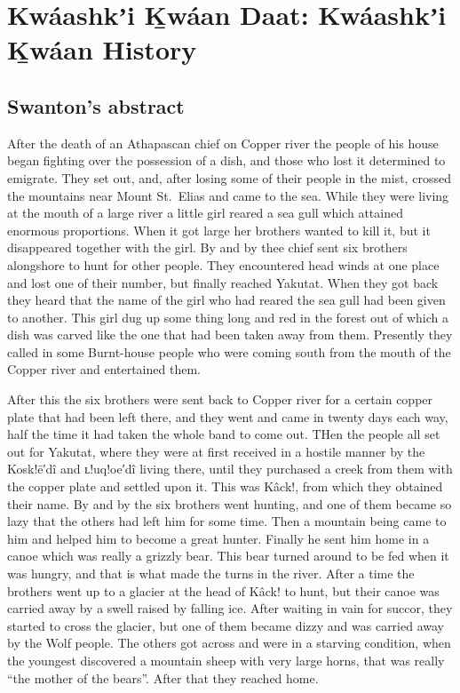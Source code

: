 
\resetexcnt
\chapter{Kwáashkʼi Ḵwáan Daat: Kwáashkʼi Ḵwáan History}\label{ch:105-kwaashkikhwaan-history}

\section{Swanton’s abstract}\label{sec:105-swanton-abstract}

After the death of an Athapascan chief on Copper river the people of his house began fighting over the possession of a dish, and those who lost it determined to emigrate.
They set out, and, after losing some of their people in the mist, crossed the mountains near Mount St.\ Elias and came to the sea.
While they were living at the mouth of a large river a little girl reared a sea gull which attained enormous proportions.
When it got large her brothers wanted to kill it, but it disappeared together with the girl.
By and by thee chief sent six brothers alongshore to hunt for other people.
They encountered head winds at one place and lost one of their number, but finally reached Yakutat.
When they got back they heard that the name of the girl who had reared the sea gull had been given to another.
This girl dug up some thing long and red in the forest out of which a dish was carved like the one that had been taken away from them.
Presently they called in some Burnt-house people who were coming south from the mouth of the Copper river and entertained them.

After this the six brothers were sent back to Copper river for a certain copper plate that had been left there, and they went and came in twenty days each way, half the time it had taken the whole band to come out.
THen the people all set out for Yakutat, where they were at first received in a hostile manner by the Kosk!ē′dî and ʟ!uq!oe′dî living there, until they purchased a creek from them with the copper plate and settled upon it.
This was Kâck!, from which they obtained their name.
By and by the six brothers went hunting, and one of them became so lazy that the others had left him for some time.
Then a mountain being came to him and helped him to become a great hunter.
Finally he sent him home in a canoe which was really a grizzly bear.
This bear turned around to be fed when it was hungry, and that is what made the turns in the river.
After a time the brothers went up to a glacier at the head of Kâck! to hunt, but their canoe was carried away by a swell raised by falling ice.
After waiting in vain for succor, they started to cross the glacier, but one of them became dizzy and was carried away by the Wolf people.
The others got across and were in a starving condition, when the youngest discovered a mountain sheep with very large horns, that was really “the mother of the bears”.
After that they reached home.

